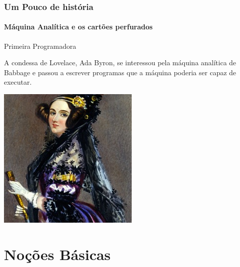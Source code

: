 \documentclass[12pt,a4paper,final]{beamer}
\begin{document}
            \begin{frame}
                \frametitle{Um Pouco de história}
                \framesubtitle{Máquina Analítica e os cartões perfurados}         
                \begin{block}{Primeira Programadora}
                    \begin{minipage}{.5\linewidth}
A condessa de Lovelace, Ada Byron, se interessou pela máquina analítica de Babbage e passou a escrever programas que a máquina poderia ser capaz de executar.
                    \end{minipage}
                    \begin{minipage}{.4\linewidth}
                        \centering
                        \includegraphics[scale=.4]{Imagens/ada.jpg}
                    \end{minipage}
                \end{block}
            \end{frame}
    \section{Noções Básicas}
\end{document}

